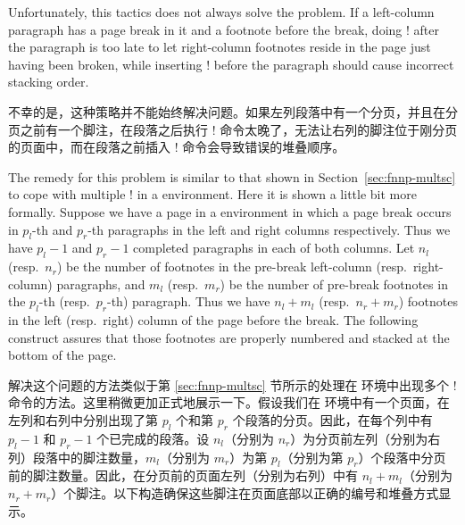 Unfortunately, this tactics does not always solve the problem.  If a
left-column paragraph has a page break in it and a footnote before the
break, doing \!\switchcolumn! after the paragraph is too late to let
right-column footnotes reside in the page just having been broken, while
inserting \!\switchcolumn! before the paragraph should cause incorrect
stacking order.

不幸的是，这种策略并不能始终解决问题。如果左列段落中有一个分页，并且在分页之前有一个脚注，在段落之后执行 \!\switchcolumn! 命令太晚了，无法让右列的脚注位于刚分页的页面中，而在段落之前插入 \!\switchcolumn! 命令会导致错误的堆叠顺序。

The remedy for this problem is similar to that shown in
Section~\ref{sec:fnnp-multsc} to cope with multiple \!\switchcolumn! in a
 environment.  Here it is shown a little bit more formally.
Suppose we have a page in a  environment in which a page
break occurs in $p_l$-th and $p_r$-th paragraphs in the left and right
columns respectively.  Thus we have $p_l-1$ and $p_r-1$ completed
paragraphs in each of both columns.  Let $n_l$ (resp.\ $n_r$) be the
number of footnotes in the pre-break left-column (resp.\ right-column)
paragraphs, and $m_l$ (resp.\ $m_r$) be the number of pre-break footnotes
in the $p_l$-th (resp.\ $p_r$-th) paragraph.  Thus we have $n_l+m_l$
(resp.\ $n_r+m_r$) footnotes in the left (resp.\ right) column of the page
before the break.  The following construct assures that those footnotes
are properly numbered and stacked at the bottom of the page.

解决这个问题的方法类似于第 \ref{sec:fnnp-multsc} 节所示的处理在  环境中出现多个 \!\switchcolumn! 命令的方法。这里稍微更加正式地展示一下。假设我们在  环境中有一个页面，在左列和右列中分别出现了第 $p_l$ 个和第 $p_r$ 个段落的分页。因此，在每个列中有 $p_l-1$ 和 $p_r-1$ 个已完成的段落。设 $n_l$（分别为 $n_r$）为分页前左列（分别为右列）段落中的脚注数量，$m_l$（分别为 $m_r$）为第 $p_l$（分别为第 $p_r$）个段落中分页前的脚注数量。因此，在分页前的页面左列（分别为右列）中有 $n_l+m_l$（分别为 $n_r+m_r$）个脚注。以下构造确保这些脚注在页面底部以正确的编号和堆叠方式显示。

